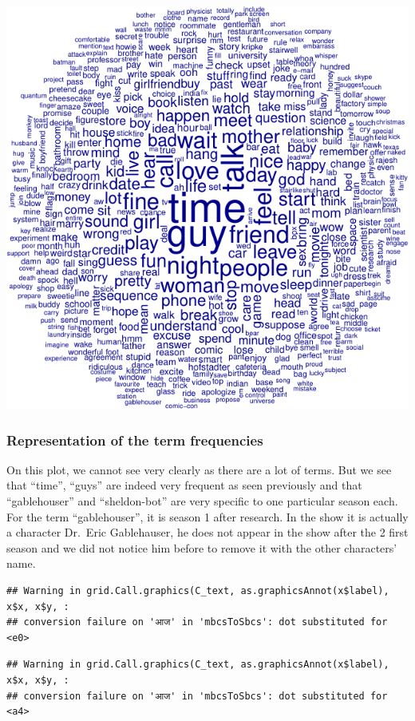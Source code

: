 \documentclass[
]{article}
\begin{document}
\includegraphics{report_files/figure-latex/unnamed-chunk-17-1.pdf}

\hypertarget{representation-of-the-term-frequencies}{%
\subsubsection{Representation of the term
frequencies}\label{representation-of-the-term-frequencies}}

On this plot, we cannot see very clearly as there are a lot of terms.
But we see that ``time'', ``guys'' are indeed very frequent as seen
previously and that ``gablehouser'' and ``sheldon-bot'' are very
specific to one particular season each. For the term ``gablehouser'', it
is season 1 after research. In the show it is actually a character
Dr.~Eric Gablehauser, he does not appear in the show after the 2 first
season and we did not notice him before to remove it with the other
characters' name.

\begin{verbatim}
## Warning in grid.Call.graphics(C_text, as.graphicsAnnot(x$label), x$x, x$y, :
## conversion failure on 'आज' in 'mbcsToSbcs': dot substituted for <e0>
\end{verbatim}

\begin{verbatim}
## Warning in grid.Call.graphics(C_text, as.graphicsAnnot(x$label), x$x, x$y, :
## conversion failure on 'आज' in 'mbcsToSbcs': dot substituted for <a4>
\end{verbatim}
\end{document}
